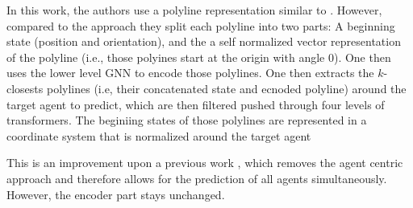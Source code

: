 \cite{tang2024hpnet} 



\cite{zhang2024real} In this work, the authors use a polyline representation similar to \cite{gao2020vectornet}. However, compared to the approach they split each polyline into two parts: A beginning state (position and orientation), and the a self normalized vector representation of the polyline (i.e., those polyines start at the origin with angle 0). One then uses the lower level GNN to encode those polylines. One then extracts the $k$-closests polylines (i.e, their concatenated state and ecnoded polyline) around the target agent to predict, which are then filtered pushed through four levels of transformers. The beginiing states of those polylines are represented in a coordinate system that is normalized around the target agent



\cite{shi2024mtr} This is an improvement upon a previous work \cite{shi2022motion}, which removes the agent centric approach and therefore allows for the prediction of all agents simultaneously. However, the encoder part stays unchanged.